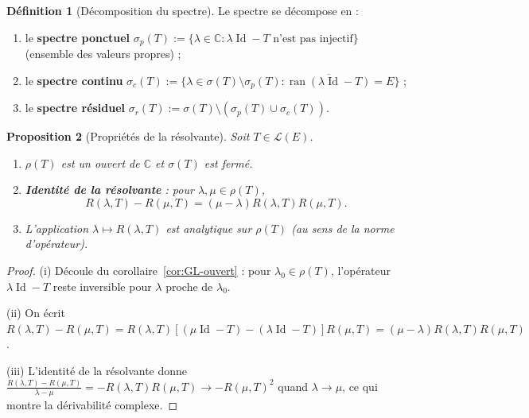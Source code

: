 \documentclass[a4paper,12pt]{book}
\DeclareMathOperator{\Id}{Id}
\DeclareMathOperator{\ran}{ran}
\newcommand{\C}{\mathbb{C}}
\theoremstyle{definition}
\newtheorem{definition}{Définition}[chapter]
\theoremstyle{plain}
\newtheorem{proposition}[definition]{Proposition}
\theoremstyle{remark}
\begin{document}
\begin{definition}[Décomposition du spectre]\label{def:decomposition-spectre}
Le spectre se décompose en :
\begin{enumerate}[label=(\roman*)]
    \item le \textbf{spectre ponctuel} $\sigma_p(T) := \{\lambda \in \C :
          \lambda\Id - T \text{ n'est pas injectif}\}$ (ensemble des valeurs propres) ;
    \item le \textbf{spectre continu} $\sigma_c(T) := \{\lambda \in \sigma(T) \setminus
          \sigma_p(T) : \overline{\ran(\lambda\Id - T)} = E\}$ ;
    \item le \textbf{spectre résiduel} $\sigma_r(T) := \sigma(T) \setminus
          (\sigma_p(T) \cup \sigma_c(T))$.
\end{enumerate}
\end{definition}

\begin{proposition}[Propriétés de la résolvante]\label{prop:resolvante-proprietes}
Soit $T \in \mathcal{L}(E)$.
\begin{enumerate}[label=(\roman*)]
    \item $\rho(T)$ est un ouvert de $\C$ et $\sigma(T)$ est fermé.
    \item \textbf{Identité de la résolvante} : pour $\lambda, \mu \in \rho(T)$,
    \[
        R(\lambda,T) - R(\mu,T) = (\mu - \lambda) R(\lambda,T) R(\mu,T).
    \]
    \item L'application $\lambda \mapsto R(\lambda,T)$ est analytique
          sur $\rho(T)$ (au sens de la norme d'opérateur).
\end{enumerate}
\end{proposition}

\begin{proof}
(i) Découle du corollaire~\ref{cor:GL-ouvert} : pour $\lambda_0 \in \rho(T)$,
l'opérateur $\lambda\Id - T$ reste inversible pour $\lambda$ proche de $\lambda_0$.

(ii) On écrit
$R(\lambda,T) - R(\mu,T) = R(\lambda,T)[(\mu\Id - T) - (\lambda\Id - T)]R(\mu,T)
= (\mu - \lambda) R(\lambda,T)R(\mu,T)$.

(iii) L'identité de la résolvante donne
$\frac{R(\lambda,T) - R(\mu,T)}{\lambda - \mu} = -R(\lambda,T)R(\mu,T) \to -R(\mu,T)^2$
quand $\lambda \to \mu$, ce qui montre la dérivabilité complexe.
\end{proof}
\end{document}
